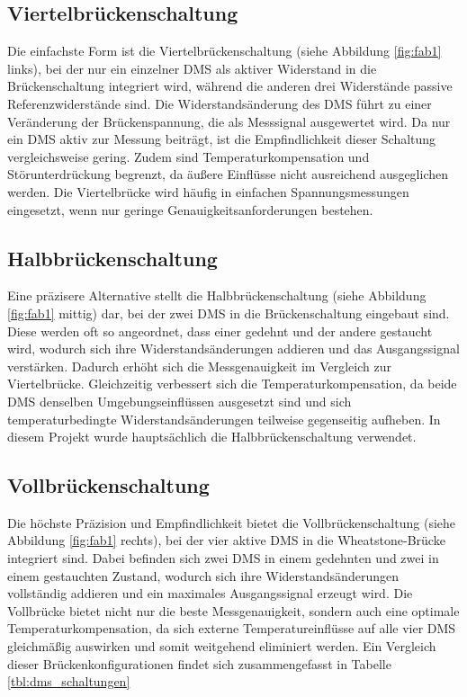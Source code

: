 \subsection{Viertelbrückenschaltung}
Die einfachste Form ist die Viertelbrückenschaltung (siehe Abbildung \ref{fig:fab1} links), bei der nur ein einzelner DMS als aktiver Widerstand in die Brückenschaltung integriert wird, während die anderen drei Widerstände passive Referenzwiderstände sind. Die Widerstandsänderung des DMS führt zu einer Veränderung der Brückenspannung, die als Messsignal ausgewertet wird. Da nur ein DMS aktiv zur Messung beiträgt, ist die Empfindlichkeit dieser Schaltung vergleichsweise gering. Zudem sind Temperaturkompensation und Störunterdrückung begrenzt, da äußere Einflüsse nicht ausreichend ausgeglichen werden. Die Viertelbrücke wird häufig in einfachen Spannungsmessungen eingesetzt, wenn nur geringe Genauigkeitsanforderungen bestehen.

\subsection{Halbbrückenschaltung}
Eine präzisere Alternative stellt die Halbbrückenschaltung  (siehe Abbildung \ref{fig:fab1} mittig) dar, bei der zwei DMS in die Brückenschaltung eingebaut sind. Diese werden oft so angeordnet, dass einer gedehnt und der andere gestaucht wird, wodurch sich ihre Widerstandsänderungen addieren und das Ausgangssignal verstärken. Dadurch erhöht sich die Messgenauigkeit im Vergleich zur Viertelbrücke. Gleichzeitig verbessert sich die Temperaturkompensation, da beide DMS denselben Umgebungseinflüssen ausgesetzt sind und sich temperaturbedingte Widerstandsänderungen teilweise gegenseitig aufheben. In diesem Projekt wurde hauptsächlich die Halbbrückenschaltung verwendet.

\subsection{Vollbrückenschaltung}
Die höchste Präzision und Empfindlichkeit bietet die Vollbrückenschaltung  (siehe Abbildung \ref{fig:fab1} rechts), bei der vier aktive DMS in die Wheatstone-Brücke integriert sind. Dabei befinden sich zwei DMS in einem gedehnten und zwei in einem gestauchten Zustand, wodurch sich ihre Widerstandsänderungen vollständig addieren und ein maximales Ausgangssignal erzeugt wird. Die Vollbrücke bietet nicht nur die beste Messgenauigkeit, sondern auch eine optimale Temperaturkompensation, da sich externe Temperatureinflüsse auf alle vier DMS gleichmäßig auswirken und somit weitgehend eliminiert werden.
Ein Vergleich dieser Brückenkonfigurationen findet sich zusammengefasst in Tabelle \ref{tbl:dms_schaltungen}


